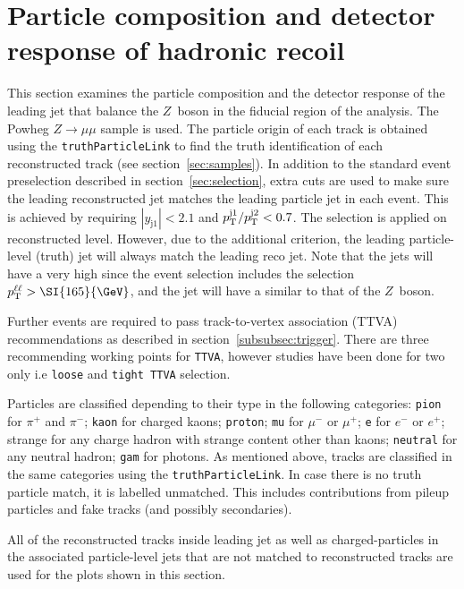 \section{Particle composition and detector response of hadronic recoil}
\label{app:jetcomp}

This section examines the particle composition and the detector response of the leading jet that balance the $Z$~boson in the fiducial region of the analysis.
The Powheg $Z\to \mu\mu$ sample is used. The particle origin of each track is obtained using the \texttt{truthParticleLink} to find the truth identification of each reconstructed track (see section~\ref{sec:samples}). In addition to the standard event preselection described in section~\ref{sec:selection}, extra cuts are used to make sure the leading reconstructed jet matches the leading particle jet in each event.
This is achieved by requiring $|y_\mathrm{j1}|<2.1$ and $p_\mathrm{T}^{\mathrm{j1}} / p_\mathrm{T}^{\mathrm{j2}} < 0.7$. The selection is applied on reconstructed level. However, due to the additional criterion, the leading particle-level (truth) jet will always match the leading reco jet. Note that the jets will have a very high \pt{} since the event selection includes the selection $\pTll > \SI{165}{\GeV}$, and the jet will have a similar \pt{} to that of the $Z$~boson.

Further events are required to pass track-to-vertex association (TTVA) recommendations as described in section~\ref{subsubsec:trigger}. There are three recommending working points for \texttt{TTVA}, however studies have been done for two only i.e \texttt{loose} and \texttt{tight TTVA} selection.

Particles are classified depending to their type in the following categories: \texttt{pion} for $\pi^+$ and $\pi^-$; \texttt{kaon} for charged kaons; \texttt{proton};
\texttt{mu} for $\mu^-$ or $\mu^+$; \texttt{e} for $e^-$ or $e^+$;
strange for any charge hadron with strange content other than kaons; \texttt{neutral} for any neutral hadron; \texttt{gam} for photons. As mentioned above, tracks are classified in the same categories using the \texttt{truthParticleLink}. In case there is no truth particle match, it is labelled unmatched. This includes contributions from pileup particles and fake tracks (and possibly secondaries).

All of the reconstructed tracks inside leading jet as well as charged-particles in the associated particle-level jets that are not matched to reconstructed tracks are used for the plots shown in this section.

